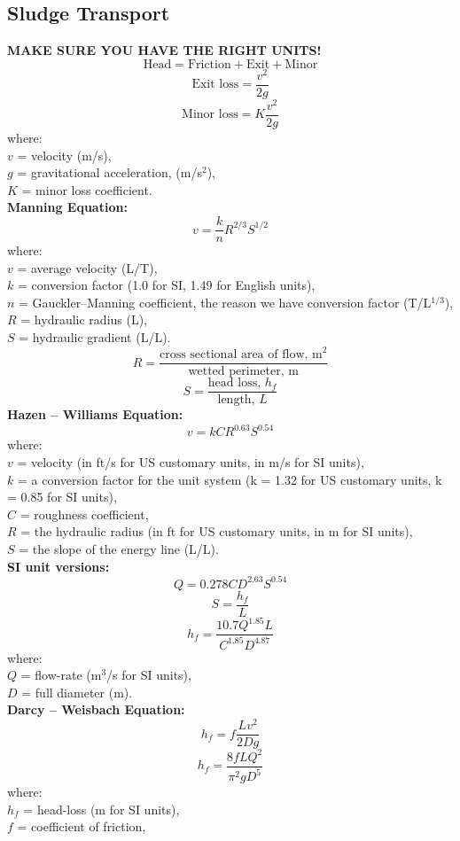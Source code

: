 \documentclass[a4paper, landscape, 8pt]{extarticle}
\begin{document}
\begin{multicols}{4}
\section*{Sludge Transport}
\textbf{MAKE SURE YOU HAVE THE RIGHT UNITS!}
\[
\text{Head} = \text{Friction} + \text{Exit} + \text{Minor}
\]
\[
\text{Exit loss} = \frac{v^2}{2g}
\]
\[
\text{Minor loss} = K\frac{v^2}{2g}
\]
where:\\
$v$ = velocity (m/s),\\
$g$ = gravitational acceleration, (m/s$^2$),\\
$K$ = minor loss coefficient.\\
\textbf{Manning Equation:}
\[
v = \frac{k}{n}R^{2/3}S^{1/2}
\]
where:\\
$v$ = average velocity (L/T),\\
$k$ = conversion factor (1.0 for SI, 1.49 for English units),\\
$n$ = Gauckler–Manning coefficient, the reason we have conversion factor (T/L$^{1/3}$),\\
$R$ = hydraulic radius (L),\\
$S$ = hydraulic gradient (L/L).
\[
R = \frac{\text{cross sectional area of flow, m}^2}{\text{wetted perimeter, m}}
\]
\[
S = \frac{\text{head loss, }h_f}{\text{length, }L}
\]
\textbf{Hazen -- Williams Equation:}
\[
v = kCR^{0.63}S^{0.54}
\]
where:\\
$v$ = velocity (in ft/s for US customary units, in m/s for SI units),\\
$k$ = a conversion factor for the unit system (k = 1.32 for US customary units, k = 0.85 for SI units),\\
$C$ = roughness coefficient,\\
$R$ = the hydraulic radius (in ft for US customary units, in m for SI units),\\
$S$ = the slope of the energy line (L/L).\\
\textbf{SI unit versions:}
\[
Q = 0.278CD^{2.63}S^{0.54}
\]
\[
S = \frac{h_f}{L}
\]
\[
h_f = \frac{10.7Q^{1.85}L}{C^{1.85}D^{4.87}}
\]
where:\\
$Q$ = flow-rate (m$^3$/s for SI units),\\
$D$ = full diameter (m).\\
\textbf{Darcy -- Weisbach Equation:}
\[
h_f = f\frac{Lv^2}{2Dg}
\]
\[
h_f = \frac{8fLQ^2}{\pi^2gD^5}
\]
where:\\
$h_f$ = head-loss (m for SI units),\\
$f$ = coefficient of friction,\\

\end{multicols}
\end{document}
